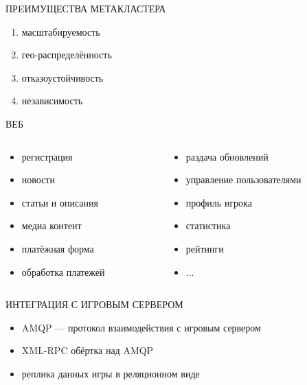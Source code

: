 \documentclass[aspectratio=169]{beamer}
\begin{document}
\begin{frame}{ПРEИМУЩЕСТВА МЕТАКЛАСТЕРА}
    \begin{enumerate}
        \item масштабируемость
        \item гео-распределённость
        \item отказоустойчивость
        \item независимость
    \end{enumerate}
\end{frame}

\begin{frame}{ВЕБ}
    \begin{columns}
        \begin{column}{0.4\textwidth}
        \begin{itemize}
            \item регистрация
            \item новости
            \item статьи и описания
            \item медиа контент
            \item платёжная форма
            \item обработка платежей
        \end{itemize}
        \end{column}

        \begin{column}{0.4\textwidth}
        \begin{itemize}
            \item раздача обновлений
            \item управление пользователями
            \item профиль игрока
            \item статистика
            \item рейтинги
            \item ...
        \end{itemize}
        \end{column}
    \end{columns}
\end{frame}

\begin{frame}{ИНТЕГРАЦИЯ С ИГРОВЫМ СЕРВЕРОМ}
    \begin{itemize}
        \item AMQP --- протокол взаимодействия с игровым сервером
        \item XML-RPC обёртка над AMQP
        \item реплика данных игры в реляционном виде
    \end{itemize}
\end{frame}
\end{document}
